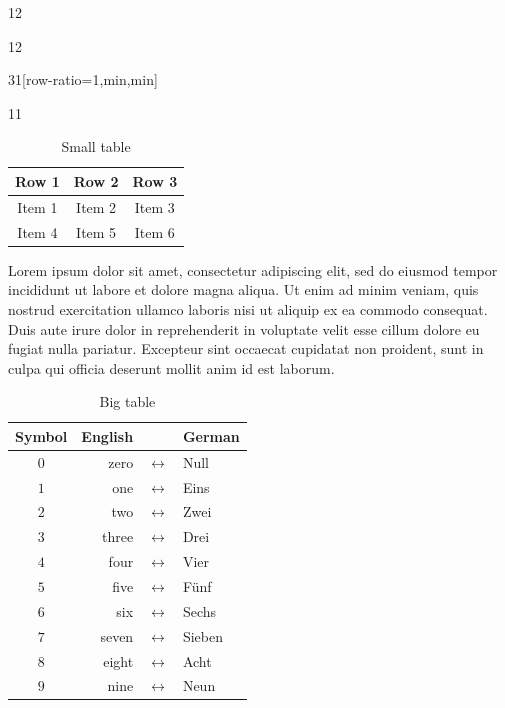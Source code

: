 \documentclass{ropas-poster}
\begin{document}
\begin{postergrid}{1}{2}
    \begin{posterblock*}{1}{2}
      \begin{postergrid}{3}{1}[row-ratio={1,min,min}]
        \begin{posterblock}{1}{1}

          \begin{table}
            \caption{Small table}
            \begin{tabular}{ccc}
              \toprule
              Row 1 & Row 2 & Row 3 \\
              \midrule
              Item 1 & Item 2 & Item 3 \\
              Item 4 & Item 5 & Item 6 \\
              \bottomrule
            \end{tabular}
          \end{table}

          Lorem ipsum dolor sit amet, consectetur adipiscing elit, sed do eiusmod tempor incididunt ut labore et dolore magna aliqua.
          Ut enim ad minim veniam, quis nostrud exercitation ullamco laboris nisi ut aliquip ex ea commodo consequat.
          Duis aute irure dolor in reprehenderit in voluptate velit esse cillum dolore eu fugiat nulla pariatur.
          Excepteur sint occaecat cupidatat non proident, sunt in culpa qui officia deserunt mollit anim id est laborum.

          \begin{table}
            \caption{Big table}
            \begin{tabular}{crcl}
              \toprule
              Symbol & English & & German \\
              \midrule
              \(0\) & zero & \(\leftrightarrow\) & Null \\
              \(1\) & one & \(\leftrightarrow\) & Eins \\
              \(2\) & two & \(\leftrightarrow\) & Zwei \\
              \(3\) & three & \(\leftrightarrow\) & Drei \\
              \(4\) & four & \(\leftrightarrow\) & Vier \\
              \(5\) & five & \(\leftrightarrow\) & F\"unf \\
              \(6\) & six & \(\leftrightarrow\) & Sechs \\
              \(7\) & seven & \(\leftrightarrow\) & Sieben \\
              \(8\) & eight & \(\leftrightarrow\) & Acht \\
              \(9\) & nine & \(\leftrightarrow\) & Neun \\
              \bottomrule
            \end{tabular}
          \end{table}
        \end{posterblock}


\end{postergrid}
\end{posterblock*}
\end{postergrid}
\end{document}
